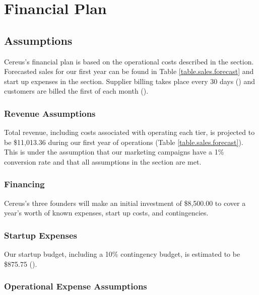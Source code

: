 {\let\cleardoublepage\relax \chapter*{Financial Plan}}

\section{Assumptions}

Cereus's financial plan is based on the operational costs described in the  section. Forecasted sales for our first year can be found in Table \ref{table.sales.forecast} and start up expenses in the  section. Supplier billing takes place every 30 days () and customers are billed the first of each month ().

\subsection{Revenue Assumptions}

Total revenue, including costs associated with operating each tier, is projected to be \$11,013.36 during our first year of operations (Table \ref{table.sales.forecast}). This is under the assumption that our marketing campaigns have a 1\% conversion rate and that all assumptions in the  section are met.

\subsection{Financing}

Cereus's three founders will make an initial investment of \$8,500.00 to cover a year's worth of known expenses, start up costs, and contingencies.

\subsection{Startup Expenses}

Our startup budget, including a 10\% contingency budget, is estimated to be \$875.75 ().

\subsection{Operational Expense Assumptions}

